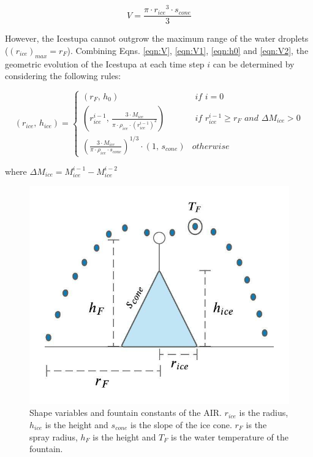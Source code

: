 \documentclass[utf8]{frontiersSCNS} %
\begin{document}
\begin{equation} V = \frac{\pi \cdot {r_{ice}}^3
		\cdot s_{cone}}{3} \label{eqn:V2} \end{equation}


However, the Icestupa cannot outgrow the maximum range of the water droplets ($(r_{ice})_{max} = r_{F}$). Combining
Eqns. \ref{eqn:V},  \ref{eqn:V1}, \ref{eqn:h0} and \ref{eqn:V2}, the geometric evolution of the Icestupa at each time
step $i$ can be determined by considering the following rules:

\begin{equation} (r_{ice},\, h_{ice}) = \left\{ \begin{array}{ll} (r_F ,\, h_0)                                                                        & \textit{ if } i=0 \\
             (r_{ice}^{i-1},\, \frac{3 \cdot M_{ice}}{\pi \cdot \rho_{ice} \cdot {(r_{ice}^{i-1})}^2}) & \textit{ if }
             r_{ice}^{i-1} \geq r_{F} \textit{ and } \Delta M_{ice} > 0                                                    \\ (\frac{3 \cdot M_{ice}}{\pi \cdot \rho_{ice} \cdot s_{cone}})^{1/3} \cdot (1,\,  s_{cone}) &
             otherwise\end{array} \right.  \label{eqn:A2} \end{equation}

where $\Delta M_{ice} = M_{ice}^{i-1} - M_{ice}^{i-2}$

\begin{figure} \begin{center} \includegraphics[width=10
			cm]{Figures/shape_parameters.jpeg} \end{center} \caption{Shape variables and fountain constants of the AIR. $r_{ice}$ is
		the radius, $h_{ice}$ is the height and $s_{cone}$ is the slope of the ice cone. $r_F$ is the spray radius, $h_F$ is the
		height and $T_F$ is the water temperature of the fountain.} \label{fig:shape} \end{figure}
\end{document}
